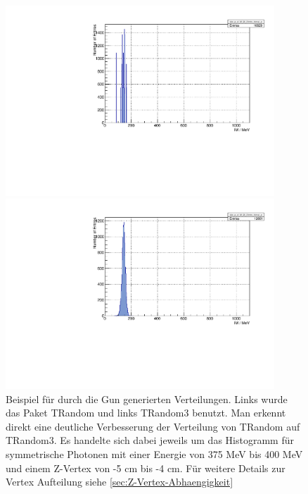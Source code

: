 \documentclass[a4paper,11pt,oneside,final,german,openbib,pdftex]{scrbook}
\begin{document}
{\begin{appendix}
\begin{figure}[h!]
	\centering
	\begin{minipage}{0.45\textwidth}
		\centering
		\includegraphics[width=0.9\textwidth]{20171104BadRandomGenerator}
	\end{minipage}
	\hfill
	\begin{minipage}{0.45\textwidth}
		\centering
		\includegraphics[width=0.9\textwidth]{20171204GoodRandomGenerator}
	\end{minipage}
\caption{Beispiel f\"ur durch die Gun generierten Verteilungen. Links wurde das Paket TRandom und links TRandom3 benutzt. Man erkennt direkt eine deutliche Verbesserung der Verteilung von TRandom auf TRandom3. Es handelte sich dabei jeweils um das Histogramm f\"ur symmetrische Photonen mit einer Energie von 375 MeV bis 400 MeV und einem Z-Vertex von -5 cm bis -4 cm. F\"ur weitere Details zur Vertex Aufteilung siehe \ref{sec:Z-Vertex-Abhaengigkeit}}
\label{fig:Random-Verteilung}
\end{figure}


\end{appendix}}
\end{document}
